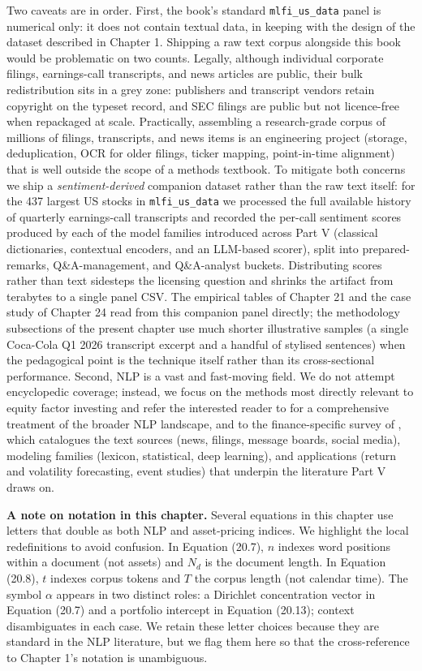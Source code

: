 Two caveats are in order. First, the book's standard \texttt{mlfi\_us\_data} panel is numerical only: it does not contain textual data, in keeping with the design of the dataset described in Chapter 1. Shipping a raw text corpus alongside this book would be problematic on two counts. Legally, although individual corporate filings, earnings-call transcripts, and news articles are public, their bulk redistribution sits in a grey zone: publishers and transcript vendors retain copyright on the typeset record, and SEC filings are public but not licence-free when repackaged at scale. Practically, assembling a research-grade corpus of millions of filings, transcripts, and news items is an engineering project (storage, deduplication, OCR for older filings, ticker mapping, point-in-time alignment) that is well outside the scope of a methods textbook. To mitigate both concerns we ship a \textit{sentiment-derived} companion dataset rather than the raw text itself: for the 437 largest US stocks in \texttt{mlfi\_us\_data} we processed the full available history of quarterly earnings-call transcripts and recorded the per-call sentiment scores produced by each of the model families introduced across Part V (classical dictionaries, contextual encoders, and an LLM-based scorer), split into prepared-remarks, Q\&A-management, and Q\&A-analyst buckets. Distributing scores rather than text sidesteps the licensing question and shrinks the artifact from terabytes to a single panel CSV. The empirical tables of Chapter 21 and the case study of Chapter 24 read from this companion panel directly; the methodology subsections of the present chapter use much shorter illustrative samples (a single Coca-Cola Q1 2026 transcript excerpt and a handful of stylised sentences) when the pedagogical point is the technique itself rather than its cross-sectional performance. Second, NLP is a vast and fast-moving field. We do not attempt encyclopedic coverage; instead, we focus on the methods most directly relevant to equity factor investing and refer the interested reader to \cite{jurafsky2024speech} for a comprehensive treatment of the broader NLP landscape, and to the finance-specific survey of \cite{xing2018natural}, which catalogues the text sources (news, filings, message boards, social media), modeling families (lexicon, statistical, deep learning), and applications (return and volatility forecasting, event studies) that underpin the literature Part V draws on.

\textbf{A note on notation in this chapter.} Several equations in this chapter use letters that double as both NLP and asset-pricing indices. We highlight the local redefinitions to avoid confusion. In Equation (20.7), $n$ indexes word positions within a document (not assets) and $N_d$ is the document length. In Equation (20.8), $t$ indexes corpus tokens and $T$ the corpus length (not calendar time). The symbol $\alpha$ appears in two distinct roles: a Dirichlet concentration vector in Equation (20.7) and a portfolio intercept in Equation (20.13); context disambiguates in each case. We retain these letter choices because they are standard in the NLP literature, but we flag them here so that the cross-reference to Chapter 1's notation is unambiguous.

